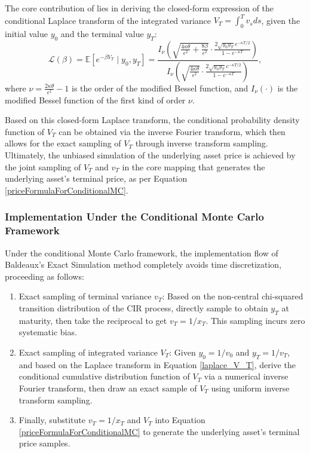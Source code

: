 The core contribution of \citet{baldeauxEXACTSIMULATION322012} lies in deriving the closed-form expression of the conditional Laplace transform of the integrated variance $V_T = \int_0^T v_s ds$, given the initial value $y_0$ and the terminal value $y_T$:
\begin{equation}
  \mathcal{L}(\beta) = \mathbb{E}\left[ e^{-\beta V_T} \mid y_0, y_T \right] = \frac{I_{\nu}\left( \sqrt{\frac{4\kappa\theta}{\epsilon^2} + \frac{8\beta}{\epsilon^2}} \cdot \frac{2\sqrt{y_0 y_T} e^{-\kappa T/2}}{1-e^{-\kappa T}} \right)}{I_{\nu}\left( \sqrt{\frac{4\kappa\theta}{\epsilon^2}} \cdot \frac{2\sqrt{y_0 y_T} e^{-\kappa T/2}}{1-e^{-\kappa T}} \right)},
  \label{laplace_V_T}
\end{equation}
where $\nu = \frac{2\kappa\theta}{\epsilon^2}-1$ is the order of the modified Bessel function, and $I_\nu(\cdot)$ is the modified Bessel function of the first kind of order $\nu$.

Based on this closed-form Laplace transform, the conditional probability density function of $V_T$ can be obtained via the inverse Fourier transform, which then allows for the exact sampling of $V_T$ through inverse transform sampling. Ultimately, the unbiased simulation of the underlying asset price is achieved by the joint sampling of $V_T$ and $v_T$ in the core mapping that generates the underlying asset's terminal price, as per Equation \eqref{priceFormulaForConditionalMC}.

\subsubsection{Implementation Under the Conditional Monte Carlo Framework}
Under the conditional Monte Carlo framework, the implementation flow of Baldeaux's Exact Simulation method completely avoids time discretization, proceeding as follows:
\begin{enumerate}
  \item Exact sampling of terminal variance $v_T$: Based on the non-central chi-squared transition distribution of the CIR process, directly sample to obtain $y_T$ at maturity, then take the reciprocal to get $v_T = 1/x_T$. This sampling incurs zero systematic bias.
  \item Exact sampling of integrated variance $V_T$: Given $y_0 = 1/v_0$ and $y_T = 1/v_T$, and based on the Laplace transform in Equation \eqref{laplace_V_T}, derive the conditional cumulative distribution function of $V_T$ via a numerical inverse Fourier transform, then draw an exact sample of $V_T$ using uniform inverse transform sampling.
  \item Finally, substitute $v_T=1/x_T$ and $V_T$ into Equation \eqref{priceFormulaForConditionalMC} to generate the underlying asset's terminal price samples.
\end{enumerate}

